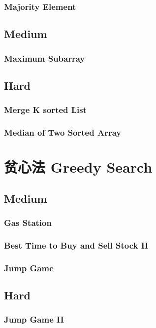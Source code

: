 \documentclass[11pt]{book}
\begin{document}
\subsection{Majority Element}
\label{sec-12-1-1}
\section{Medium}
\label{sec-12-2}
\subsection{Maximum Subarray}
\label{sec-12-2-1}
\section{Hard}
\label{sec-12-3}
\subsection{Merge K sorted List}
\label{sec-12-3-1}
\subsection{Median of Two Sorted Array}
\label{sec-12-3-2}
\chapter{贫心法 Greedy Search}
\label{sec-13}
\section{Medium}
\label{sec-13-1}
\subsection{Gas Station}
\label{sec-13-1-1}
\subsection{Best Time to Buy and Sell Stock II}
\label{sec-13-1-2}
\subsection{Jump Game}
\label{sec-13-1-3}
\section{Hard}
\label{sec-13-2}
\subsection{Jump Game II}
\label{sec-13-2-1}
\end{document}
